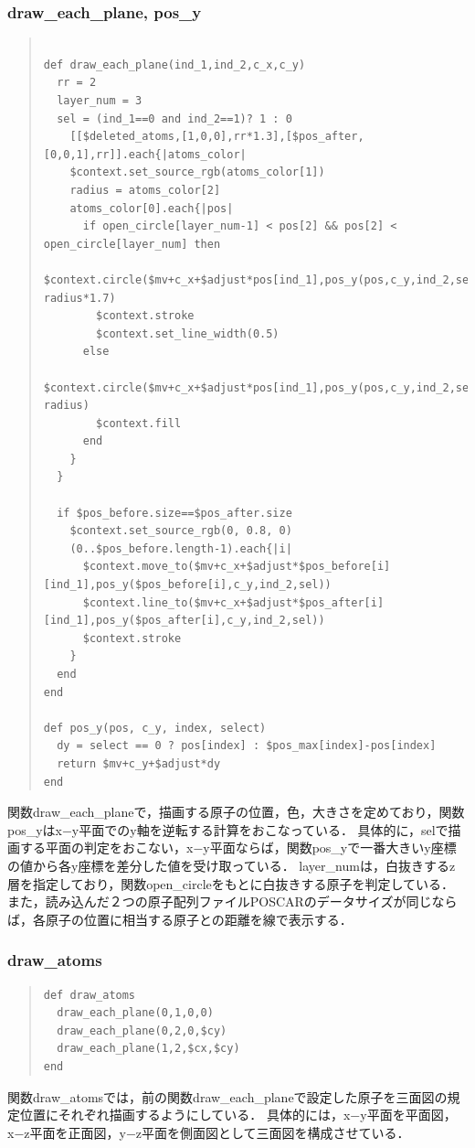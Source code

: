 \subsubsection{draw\_each\_plane, pos\_y}\begin{quote}\begin{verbatim}

def draw_each_plane(ind_1,ind_2,c_x,c_y)
  rr = 2
  layer_num = 3
  sel = (ind_1==0 and ind_2==1)? 1 : 0
    [[$deleted_atoms,[1,0,0],rr*1.3],[$pos_after,[0,0,1],rr]].each{|atoms_color|
    $context.set_source_rgb(atoms_color[1])
    radius = atoms_color[2]
    atoms_color[0].each{|pos|
      if open_circle[layer_num-1] < pos[2] && pos[2] < open_circle[layer_num] then
        $context.circle($mv+c_x+$adjust*pos[ind_1],pos_y(pos,c_y,ind_2,sel), radius*1.7)
        $context.stroke
        $context.set_line_width(0.5)
      else
        $context.circle($mv+c_x+$adjust*pos[ind_1],pos_y(pos,c_y,ind_2,sel), radius)
        $context.fill
      end
    }
  }

  if $pos_before.size==$pos_after.size
    $context.set_source_rgb(0, 0.8, 0)
    (0..$pos_before.length-1).each{|i|
      $context.move_to($mv+c_x+$adjust*$pos_before[i][ind_1],pos_y($pos_before[i],c_y,ind_2,sel))
      $context.line_to($mv+c_x+$adjust*$pos_after[i][ind_1],pos_y($pos_after[i],c_y,ind_2,sel))
      $context.stroke
    }
  end
end

def pos_y(pos, c_y, index, select)
  dy = select == 0 ? pos[index] : $pos_max[index]-pos[index]
  return $mv+c_y+$adjust*dy
end
\end{verbatim}\end{quote}
関数draw\_each\_planeで，描画する原子の位置，色，大きさを定めており，関数pos\_yはx−y平面でのy軸を逆転する計算をおこなっている．
具体的に，selで描画する平面の判定をおこない，x−y平面ならば，関数pos\_yで一番大きいy座標の値から各y座標を差分した値を受け取っている．
layer\_numは，白抜きするz層を指定しており，関数open\_circleをもとに白抜きする原子を判定している．
また，読み込んだ２つの原子配列ファイルPOSCARのデータサイズが同じならば，各原子の位置に相当する原子との距離を線で表示する．

\subsubsection{draw\_atoms}\begin{quote}\begin{verbatim}
def draw_atoms
  draw_each_plane(0,1,0,0)    
  draw_each_plane(0,2,0,$cy)   
  draw_each_plane(1,2,$cx,$cy) 
end
\end{verbatim}\end{quote}
関数draw\_atomsでは，前の関数draw\_each\_planeで設定した原子を三面図の規定位置にそれぞれ描画するようにしている．
具体的には，x−y平面を平面図，x−z平面を正面図，y−z平面を側面図として三面図を構成させている．

